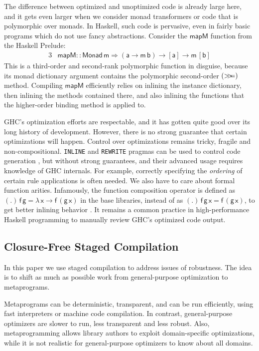 \documentclass[acmsmall,screen,review,anonymous]{acmart}
\newcommand{\msf}[1]{{\mathsf{#1}}}
\newcommand{\lam}{\lambda\,}
\newcommand{\vm}{\mathsf{m}}
\newcommand{\va}{\mathsf{a}}
\newcommand{\vb}{\mathsf{b}}
\newcommand{\vx}{\mathsf{x}}
\newcommand{\vf}{\mathsf{f}}
\newcommand{\vg}{\mathsf{g}}
\newcommand{\Monad}{\msf{Monad}}
\newcommand{\bind}{\mathbin{>\!\!>\mkern-6.7mu=}}
\theoremstyle{remark}
\begin{document}
The difference between optimized and unoptimized code is already large here, and
it gets even larger when we consider monad transformers or code that is
polymorphic over monads. In Haskell, such code is pervasive, even in fairly
basic programs which do not use fancy abstractions. Consider the $\msf{mapM}$
function from the Haskell Prelude:
\begin{alignat*}{3}
  & \msf{mapM} :: \Monad\,\vm \Rightarrow (\va \to \vm\,\vb) \to [\va] \to \vm\,[\vb]
\end{alignat*}
This is a third-order and second-rank polymorphic function in disguise, because
its monad dictionary argument contains the polymorphic second-order $(\bind)$
method. Compiling $\msf{mapM}$ efficiently relies on inlining the instance
dictionary, then inlining the methods contained there, and also inlining the
functions that the higher-order binding method is applied to.

GHC's optimization efforts are respectable, and it has gotten quite good over
its long history of development. However, there is no strong guarantee that
certain optimizations will happen. Control over optimizations remains tricky,
fragile and non-compositional. \texttt{INLINE} and \texttt{REWRITE} pragmas can
be used to control code generation \cite{ghcdocs}, but without strong
guarantees, and their advanced usage requires knowledge of GHC internals. For
example, correctly specifying the \emph{ordering} of certain rule applications
is often needed. We also have to care about formal function arities. Infamously,
the function composition operator is defined as $(.)\,\vf\,\vg = \lam \vx \to
\vf\,(\vg\,\vx)$ in the base libraries, instead of as $(.)\,\vf\,\vg\,\vx =
\vf\,(\vg\,\vx)$, to get better inlining behavior \cite{ghcbase}. It remains a
common practice in high-performance Haskell programming to manually review GHC's
optimized code output.

\subsection{Closure-Free Staged Compilation}

In this paper we use staged compilation to address issues of robustness. The
idea is to shift as much as possible work from general-purpose optimization to
metaprograms.

Metaprograms can be deterministic, transparent, and can be run efficiently,
using fast interpreters or machine code compilation. In contrast,
general-purpose optimizers are slower to run, less transparent and less
robust. Also, metaprogramming allows library authors to exploit
domain-specific optimizations, while it is not realistic for general-purpose
optimizers to know about all domains.
\end{document}
